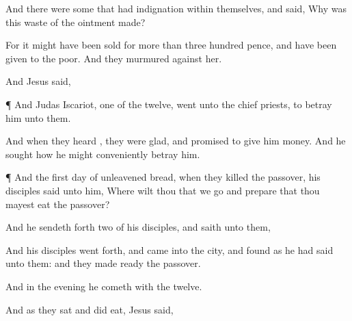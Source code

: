 {And there
were
some that had
indignation
within
themselves,
and
said,
Why
was
this
waste of the
ointment
made?

For
it
might have been
sold for more
than three
hundred
pence,
and have been
given to the
poor.
And they murmured
against
her.

And
Jesus
said,
{}





\par }{\PP {}¶
And
Judas
Iscariot,
one of the
twelve,
went
unto the chief
priests,
to
betray
him unto
them.

And when
they
heard
{}, they were
glad,
and
promised to
give
him
money.
And he
sought
how he
might
conveniently
betray
him.


\par }{\PP {}¶
And the
first
day of unleavened
bread,
when they
killed the
passover,
his
disciples
said unto
him,
Where wilt
thou that we
go and
prepare
that thou mayest
eat the
passover?

And he sendeth
forth
two of
his
disciples,
and
saith unto
them,
{}



And
his
disciples went
forth,
and
came
into the
city,
and
found
as he had
said unto
them:
and they made
ready the
passover.

And
in the
evening he
cometh
with the
twelve.

And as
they
sat
and did
eat,
Jesus
said,
{}

}

